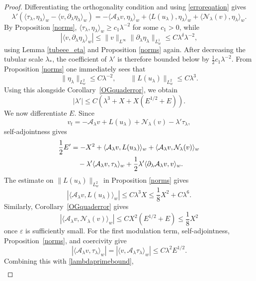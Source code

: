 \documentclass[11pt,a4paper]{article}
\numberwithin{equation}{section}
\theoremstyle{plain}
\theoremstyle{remark}
\begin{document}
\begin{proof}
Differentiating the orthogonality condition and using
\eqref{erroreqation} gives
$$
\lambda'
\left(
\langle\tau_\lambda,\eta_\lambda\rangle_w-\langle v,\partial_\lambda\eta_\lambda\rangle_w
\right)
=
-\langle\mathcal A_\lambda v,\eta_\lambda\rangle_w
+
\langle L(u_\lambda),\eta_\lambda\rangle_w
+
\langle\mathcal N_\lambda(v),\eta_\lambda\rangle_w.
$$
By Proposition \ref{norms}, $\langle\tau_\lambda,\eta_\lambda\rangle_w\geq c_1\lambda^{-2}$
for some $c_1>0$, while
$$
\left|
\langle v,\partial_\lambda\eta_\lambda\rangle_w
\right|
\leq
\|v\|_{L^\infty}
\|\partial_\lambda\eta_\lambda\|_{L_w^1}
\leq
C\lambda^\delta\lambda^{-2},
$$
using Lemma \ref{tubeee_eta} and Proposition \ref{norms} again.
After decreasing the tubular scale $\lambda_*$, the coefficient of
$\lambda'$ is therefore bounded below by
$\frac12c_1\lambda^{-2}$.
From Proposition \ref{norms} one immediately sees that
$$
\|\eta_\lambda\|_{L_w^2}\leq C\lambda^{-2},
\qquad
\|L(u_\lambda)\|_{L_w^2}\leq C\lambda^3.
$$
Using this alongside Corollary~\ref{OGquaderror}, we obtain
\begin{equation}\label{lambdaprimebound}
|\lambda'|
\leq
C\left(
\lambda^3+X+X(E^{1/2}+E)
\right).
\end{equation}
We now differentiate $E$. Since
$$
v_t
=
-\mathcal A_\lambda v
+
L(u_\lambda)
+
\mathcal N_\lambda(v)
-
\lambda'\tau_\lambda,
$$
self-adjointness gives
\begin{align}
\frac12E'
&=
-X^2
+
\langle\mathcal A_\lambda v,L(u_\lambda)\rangle_w
+
\langle\mathcal A_\lambda v,\mathcal N_\lambda(v)\rangle_w
\notag\\
&\quad
-\lambda'\langle\mathcal A_\lambda v,\tau_\lambda\rangle_w
+
\frac12\lambda'
\langle\partial_\lambda\mathcal A_\lambda v,v\rangle_w.
\label{Eeqn_eta}
\end{align}
The estimate on $\|L(u_\lambda)\|_{L^2_w}$ in Proposition \ref{norms} gives
$$
\left|
\langle\mathcal A_\lambda v,L(u_\lambda)\rangle_w
\right|
\leq
C\lambda^3X
\leq
\frac18X^2+C\lambda^6.
$$
Similarly, Corollary~\ref{OGquaderror} gives
$$
\left|
\langle\mathcal A_\lambda v,\mathcal N_\lambda(v)\rangle_w
\right|
\leq
CX^2(E^{1/2}+E)
\leq
\frac18X^2
$$
once $\varepsilon$ is sufficiently small.
For the first modulation term, self-adjointness,
Proposition~\ref{norms}, and coercivity give
$$
\left|
\langle\mathcal A_\lambda v,\tau_\lambda\rangle_w
\right|
=
\left|
\langle v,\mathcal A_\lambda\tau_\lambda\rangle_w
\right|
\leq
C\lambda^2E^{1/2}.
$$
Combining this with \eqref{lambdaprimebound},
\begin{equation*}
\begin{aligned}

\end{aligned}
\end{equation*}
\end{proof}
\end{document}
